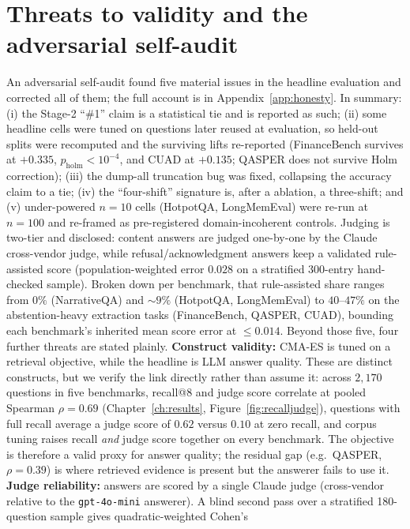 \section{Threats to validity and the adversarial self-audit}
\label{sec:threats}
An adversarial self-audit found five material issues in the headline
evaluation and corrected all of them; the full account is in
Appendix~\ref{app:honesty}. In summary: (i) the Stage-2 ``\#1'' claim is a
statistical tie and is reported as such; (ii) some headline cells were tuned on
questions later reused at evaluation, so held-out splits were recomputed and the
surviving lifts re-reported (FinanceBench survives at $+0.335$,
$p_{\mathrm{holm}}<10^{-4}$, and CUAD at $+0.135$; QASPER does not survive Holm
correction); (iii) the
dump-all truncation bug was fixed, collapsing the accuracy claim to a tie; (iv)
the ``four-shift'' signature is, after a \wgraph{} ablation, a three-shift; and
(v) under-powered $n{=}10$ cells (HotpotQA, LongMemEval) were re-run at
$n{=}100$ and re-framed as pre-registered domain-incoherent controls.
Judging is two-tier and disclosed: content answers are judged one-by-one by the
Claude cross-vendor judge, while refusal/acknowledgment answers keep a validated
rule-assisted score (population-weighted error $0.028$ on a stratified 300-entry
hand-checked sample). Broken down per benchmark, that rule-assisted share ranges
from $0\%$ (NarrativeQA) and $\sim9\%$ (HotpotQA, LongMemEval) to $40$--$47\%$ on
the abstention-heavy extraction tasks (FinanceBench, QASPER, CUAD), bounding each
benchmark's inherited mean score error at $\le 0.014$. Beyond those five, four further threats are stated plainly. \textbf{Construct
validity:} CMA-ES is tuned on a \recallk{} retrieval objective, while the
headline is LLM answer quality. These are distinct constructs, but we verify the
link directly rather than assume it: across $2{,}170$ questions in five
benchmarks, recall@8 and judge score correlate at pooled Spearman $\rho=0.69$
(Chapter~\ref{ch:results}, Figure~\ref{fig:recalljudge}), questions with full
recall average a judge score of $0.62$ versus $0.10$ at zero recall, and corpus
tuning raises recall \emph{and} judge score together on every benchmark. The
objective is therefore a valid proxy for answer quality; the residual gap (e.g.\
QASPER, $\rho=0.39$) is where retrieved evidence is present but the answerer
fails to use it.
\textbf{Judge reliability:} answers are scored by a single Claude judge
(cross-vendor relative to the \texttt{gpt-4o-mini} answerer). A blind second pass
over a stratified 180-question sample gives quadratic-weighted Cohen's
